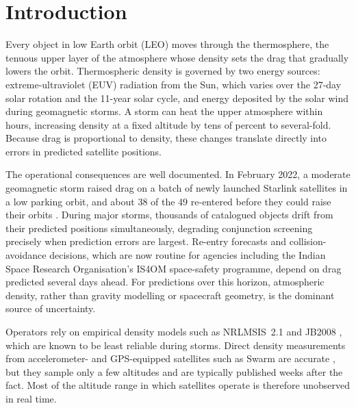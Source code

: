 \documentclass[11pt]{article}
\begin{document}
\section{Introduction}

Every object in low Earth orbit (LEO) moves through the thermosphere, the tenuous upper layer of the atmosphere whose density sets the drag that gradually lowers the orbit. Thermospheric density is governed by two energy sources: extreme-ultraviolet (EUV) radiation from the Sun, which varies over the 27-day solar rotation and the 11-year solar cycle, and energy deposited by the solar wind during geomagnetic storms. A storm can heat the upper atmosphere within hours, increasing density at a fixed altitude by tens of percent to several-fold. Because drag is proportional to density, these changes translate directly into errors in predicted satellite positions.

The operational consequences are well documented. In February 2022, a moderate geomagnetic storm raised drag on a batch of newly launched Starlink satellites in a low parking orbit, and about 38 of the 49 re-entered before they could raise their orbits \citep{fang2022}. During major storms, thousands of catalogued objects drift from their predicted positions simultaneously, degrading conjunction screening precisely when prediction errors are largest. Re-entry forecasts and collision-avoidance decisions, which are now routine for agencies including the Indian Space Research Organisation's IS4OM space-safety programme, depend on drag predicted several days ahead. For predictions over this horizon, atmospheric density, rather than gravity modelling or spacecraft geometry, is the dominant source of uncertainty.

Operators rely on empirical density models such as NRLMSIS~2.1 \citep{emmert2022} and JB2008 \citep{bowman2008}, which are known to be least reliable during storms. Direct density measurements from accelerometer- and GPS-equipped satellites such as Swarm are accurate \citep{vandenijssel2020}, but they sample only a few altitudes and are typically published weeks after the fact. Most of the altitude range in which satellites operate is therefore unobserved in real time.
\end{document}
